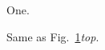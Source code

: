 \documentclass{aastex}
\newcommand{\fig}[1]{Fig.~\ref{#1}}
\begin{document}
\begin{figure}\caption{One.}\label{f1}\end{figure}
\begin{figure}\caption{Same as \fig{f1}{\it top}.}\label{f2}\end{figure}
\end{document}
